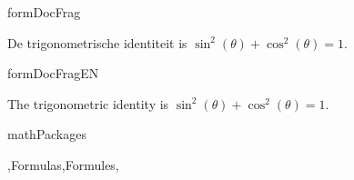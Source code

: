 
\copyrightVincent

\begin{saveblock}{formDocFrag}
	\begin{highlightblock}[gobble=8,linewidth=25em,linewidth=\textwidth]
		De trigonometrische identiteit
		is $ \sin^2(\theta) + \cos^2(\theta) = 1 $.
	\end{highlightblock}
\end{saveblock}

\begin{saveblock}{formDocFragEN}
	\begin{highlightblock}[gobble=8,linewidth=25em,linewidth=\textwidth]
		The trigonometric identity
		is $ \sin^2(\theta) + \cos^2(\theta) = 1 $.
	\end{highlightblock}
\end{saveblock}

\begin{saveblock}{mathPackages}
	\begin{highlightblock}[gobble=8,linewidth=\textwidth]
		\usepackage{amsmath,amssymb}
		\usepackage{commath,mathtools}
	\end{highlightblock}
\end{saveblock}

\addtorecentlist{\$ \$}

\begin{frame}{\lang,Formulas,Formules,}
	\centering
	
	\vspace{10pt}
	\begin{center}%
	\end{center}

	\begin{center}
	\end{center}
\end{frame}
